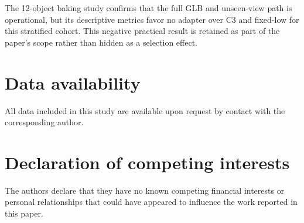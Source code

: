 \documentclass[times,twocolumn,final]{elsarticle}
\begin{document}
The 12-object baking study confirms that the full GLB and unseen-view path is operational, but its descriptive metrics favor no adapter over C3 and fixed-low for this stratified cohort. This negative practical result is retained as part of the paper's scope rather than hidden as a selection effect.

\section*{Data availability}

All data included in this study are available upon request by contact with the corresponding author.

\section*{Declaration of competing interests}

The authors declare that they have no known competing financial interests or personal relationships that could have appeared to influence the work reported in this paper.
\end{document}
